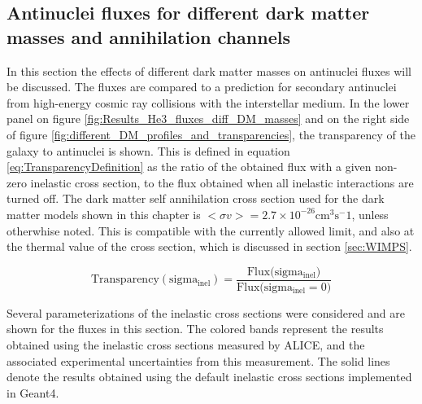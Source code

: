 \subsection{Antinuclei fluxes for different dark matter masses and annihilation channels}
In this section the effects of different dark matter masses on antinuclei fluxes will be discussed. The fluxes are compared to a prediction for secondary antinuclei from high-energy cosmic ray collisions with the interstellar medium. In the lower panel on figure \ref{fig:Results_He3_fluxes_diff_DM_masses} and  on the right side of figure \ref{fig:different_DM_profiles_and_transparencies}, the transparency of the galaxy to antinuclei is shown. This is defined in equation \ref{eq:TransparencyDefinition} as the ratio of the obtained flux with a given non-zero inelastic cross section, to the flux obtained when all inelastic interactions are turned off. The dark matter self annihilation cross section used for the dark matter models shown in this chapter is $<\sigma v>=2.7 \times 10^{-26}$cm$^3 \mathrm{s}^-1$, unless otherwhise noted. This is compatible with the currently allowed limit, and also at the thermal value of the cross section, which is discussed in section \ref{sec:WIMPS}. 

\begin{equation}\label{eq:TransparencyDefinition}
    \mathrm{Transparency(sigma_{inel})} = \frac{\mathrm{Flux(sigma_{inel}})}{\mathrm{Flux(sigma_{inel}=0})} 
\end{equation}

Several parameterizations of the inelastic cross sections were considered and are shown for the fluxes in this section. The colored bands represent the results obtained using the inelastic cross sections measured by ALICE, and the associated experimental uncertainties from this measurement. The solid lines denote the results obtained using the default inelastic cross sections implemented in Geant4. 

